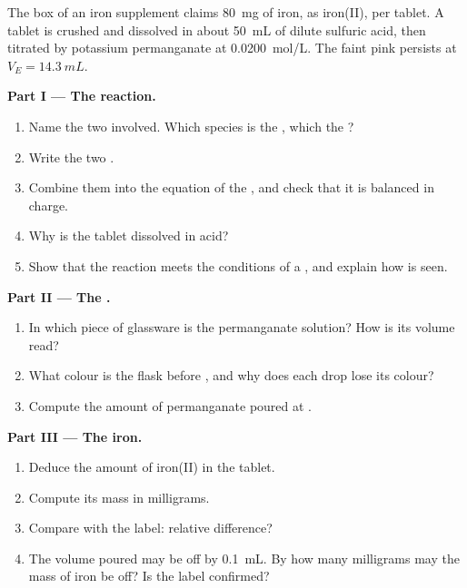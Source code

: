 \begin{problem}
\label{pb:g11:titration:1}
The box of an iron supplement claims \qty{80}{mg} of iron, as iron(II),
per tablet. A tablet is crushed and dissolved in about \qty{50}{mL} of
dilute sulfuric acid, then titrated by potassium permanganate at
\qty{0.0200}{mol/L}. The faint pink persists at $V_E = \qty{14.3}{mL}$.

\medskip
\noindent\textbf{Part I --- The reaction.}
\begin{enumerate}
  \item Name the two  involved. Which species is the
        , which the ?
  \item Write the two .
  \item Combine them into the equation of the , and check that
        it is balanced in charge.
  \item Why is the tablet dissolved in acid?
  \item Show that the reaction meets the conditions of a , and
        explain how  is seen.
\end{enumerate}

\medskip
\noindent\textbf{Part II --- The .}
\begin{enumerate}[resume]
  \item In which piece of glassware is the permanganate solution? How is
        its volume read?
  \item What colour is the flask before , and why does each
        drop lose its colour?
  \item Compute the amount of permanganate poured at .
\end{enumerate}

\medskip
\noindent\textbf{Part III --- The iron.}
\begin{enumerate}[resume]
  \item Deduce the amount of iron(II) in the tablet.
  \item Compute its mass in milligrams.
  \item Compare with the label: relative difference?
  \item The volume poured may be off by \qty{0.1}{mL}. By how many
        milligrams may the mass of iron be off? Is the label confirmed?
\end{enumerate}


\end{problem}
